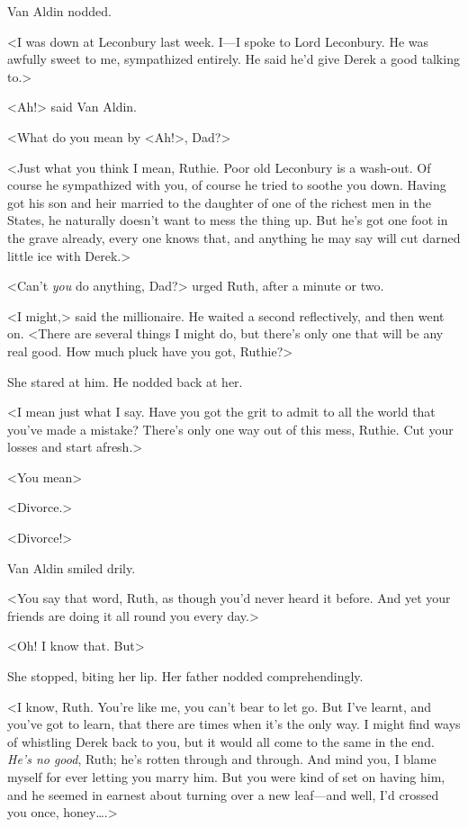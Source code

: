 Van Aldin nodded.

<I was down at Leconbury last week. I—I spoke to Lord Leconbury. He was awfully sweet to me, sympathized entirely. He said he'd give Derek a good talking to.>

<Ah!> said Van Aldin.

<What do you mean by <Ah!>, Dad?>

<Just what you think I mean, Ruthie. Poor old Leconbury is a wash-out. Of course he sympathized with you, of course he tried to soothe you down. Having got his son and heir married to the daughter of one of the richest men in the States, he naturally doesn't want to mess the thing up. But he's got one foot in the grave already, every one knows that, and anything he may say will cut darned little ice with Derek.>

<Can't \emph{you} do anything, Dad?> urged Ruth, after a minute or two.

<I might,> said the millionaire. He waited a second reflectively, and then went on. <There are several things I might do, but there's only one that will be any real good. How much pluck have you got, Ruthie?>

She stared at him. He nodded back at her.

<I mean just what I say. Have you got the grit to admit to all the world that you've made a mistake? There's only one way out of this mess, Ruthie. Cut your losses and start afresh.>

<You mean\longdash>

<Divorce.>

<Divorce!>

Van Aldin smiled drily.

<You say that word, Ruth, as though you'd never heard it before. And yet your friends are doing it all round you every day.>

<Oh! I know that. But\longdash>

She stopped, biting her lip. Her father nodded comprehendingly.

<I know, Ruth. You're like me, you can't bear to let go. But I've learnt, and you've got to learn, that there are times when it's the only way. I might find ways of whistling Derek back to you, but it would all come to the same in the end. \emph{He's no good}, Ruth; he's rotten through and through. And mind you, I blame myself for ever letting you marry him. But you were kind of set on having him, and he seemed in earnest about turning over a new leaf—and well, I'd crossed you once, honey\dots.>

